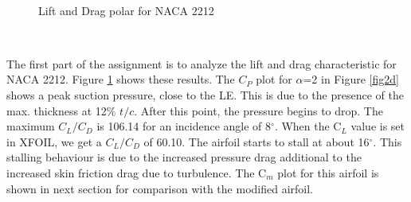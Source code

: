 \documentclass[main.tex]{subfiles}
\begin{document}
\begin{figure}[h!]
{        \label{fig2d} } \\\vspace*{-0.5em}
    \caption{Lift and Drag polar for NACA 2212}\vspace*{-1.9em}
    \label{fig2}
\end{figure}
\\\vspace*{-2.5em}
\par The first part of the assignment is to analyze the lift and drag characteristic for NACA 2212. Figure \ref{fig2} shows these results. The $C_P$ plot for $\alpha$=2 in Figure \ref{fig2d} shows a peak suction pressure, close to the LE. This is due to the presence of the max. thickness at 12$\%$ $t/c$. After this point, the pressure begins to drop. The maximum $C_L/C_D$ is 106.14 for an incidence angle of 8$^{\circ}$. When the C$_L$ value is set in XFOIL, we get a $C_L/C_D$ of 60.10. The airfoil starts to stall at about 16$^{\circ}$. This stalling behaviour is due to the increased pressure drag additional to the increased skin friction drag due to turbulence. The C$_m$ plot for this airfoil is shown in next section for comparison with the modified airfoil.
\end{document}
